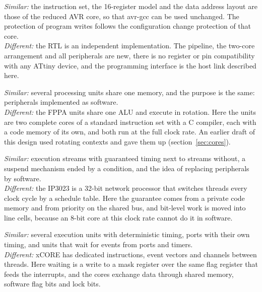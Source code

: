 \documentclass[10pt,a4paper]{article}
\begin{document}
\begin{description}[leftmargin=1.4em,style=nextline,itemsep=4pt]
\item[AVR reduced core (ATtiny4/5/9/10/20/40 class)]
\textit{Similar:} the instruction set, the 16-register model and the data address layout are those of the
reduced AVR core, so that avr-gcc can be used unchanged. The protection of program writes follows the
configuration change protection of that core.\\
\textit{Different:} the RTL is an independent implementation. The pipeline, the two-core arrangement and all peripherals are new, there is no register or pin compatibility with any ATtiny device, and the programming
interface is the host link described here.

\item[Padauk FPPA microcontrollers]
\textit{Similar:} several processing units share one memory, and the purpose is the same: peripherals
implemented as software.\\
\textit{Different:} the FPPA units share one ALU and execute in rotation. Here the units are two complete cores
of a standard instruction set with a C compiler, each with a code memory of its own, and both run at the full
clock rate. An earlier draft of this design used rotating contexts and gave them up (section~\ref{sec:cores}).

\item[Ubicom IP3023]
\textit{Similar:} execution streams with guaranteed timing next to streams without, a suspend mechanism ended
by a condition, and the idea of replacing peripherals by software.\\
\textit{Different:} the IP3023 is a 32-bit network processor that switches threads every clock cycle by a
schedule table. Here the guarantee comes from a private code memory and from priority on the shared bus, and
bit-level work is moved into line cells, because an 8-bit core at this clock rate cannot do it in software.

\item[XMOS xCORE]
\textit{Similar:} several execution units with deterministic timing, ports with their own timing, and units
that wait for events from ports and timers.\\
\textit{Different:} xCORE has dedicated instructions, event vectors and channels between threads. Here waiting
is a write to a mask register over the same flag register that feeds the interrupts, and the cores exchange
data through shared memory, software flag bits and lock bits.


\end{description}
\end{document}
